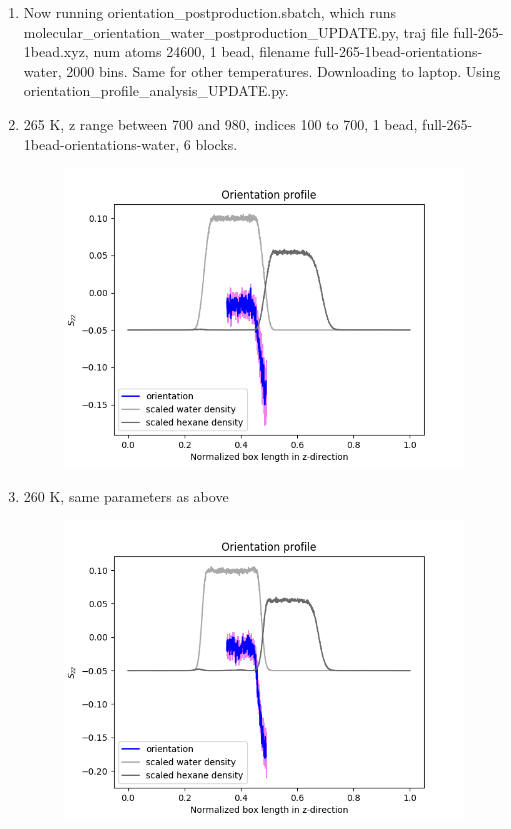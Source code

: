 \documentclass[12pt,reqno]{amsart}
\numberwithin{equation}{section}
\begin{document}
\begin{enumerate}
\item Now running orientation\_postproduction.sbatch, which runs molecular\_orientation\_water\_postproduction\_UPDATE.py, traj file full-265-1bead.xyz, num atoms 24600, 1 bead, filename full-265-1bead-orientations-water, 2000 bins.  Same for other temperatures. Downloading to laptop. Using orientation\_profile\_analysis\_UPDATE.py.  

\item 265 K, z range between 700 and 980, indices 100 to 700, 1 bead, full-265-1bead-orientations-water, 6 blocks.  

\begin{figure}[H]
\centering
\includegraphics[scale=0.6]{full-265-1bead-orientations-water}
\end{figure}

\item 260 K, same parameters as above

\begin{figure}[H]
\centering
\includegraphics[scale=0.6]{full-260-1bead-orientations-water}
\end{figure}


\end{enumerate}
\end{document}
